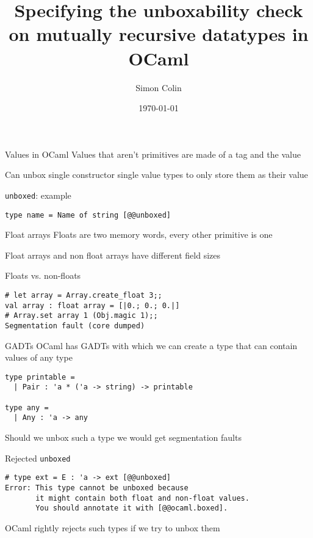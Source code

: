 \documentclass[svgnames]{beamer}
\title{Specifying the unboxability check on mutually recursive datatypes in OCaml}
\author{Simon Colin}
\date{\today}
\begin{document}
\begin{frame}
  \titlepage
\end{frame}

\begin{frame}{Values in OCaml}
	Values that aren't primitives are made of a tag and the value
	
	\vfill
	
	Can unbox single constructor single value types to only store them as their value
  
\end{frame}

\begin{frame}[fragile]{\texttt{unboxed}: example}
\begin{lstlisting}
type name = Name of string [@@unboxed]
\end{lstlisting}
\end{frame}

\begin{frame}{Float arrays}
	Floats are two memory words, every other primitive is one
	
	\vfill
	
	Float arrays and non float arrays have different field sizes
\end{frame}

\begin{frame}[fragile]{Floats vs. non-floats}
\begin{lstlisting}
# let array = Array.create_float 3;;
val array : float array = [|0.; 0.; 0.|]
# Array.set array 1 (Obj.magic 1);;
Segmentation fault (core dumped)
\end{lstlisting}
\end{frame}

\begin{frame}[fragile]{GADTs}
	OCaml has GADTs with which we can create a type that can contain values of any type
	\vfill
\begin{lstlisting}
type printable =
  | Pair : 'a * ('a -> string) -> printable

type any =
  | Any : 'a -> any
\end{lstlisting}
	\vfill
	Should we unbox such a type we would get segmentation faults
\end{frame}

\begin{frame}[fragile]{Rejected \texttt{unboxed}}
\begin{lstlisting}
# type ext = E : 'a -> ext [@@unboxed]
Error: This type cannot be unboxed because
       it might contain both float and non-float values.
       You should annotate it with [@@ocaml.boxed].
\end{lstlisting}
	\vfill

	OCaml rightly rejects such types if we try to unbox them
\end{frame}
\end{document}
